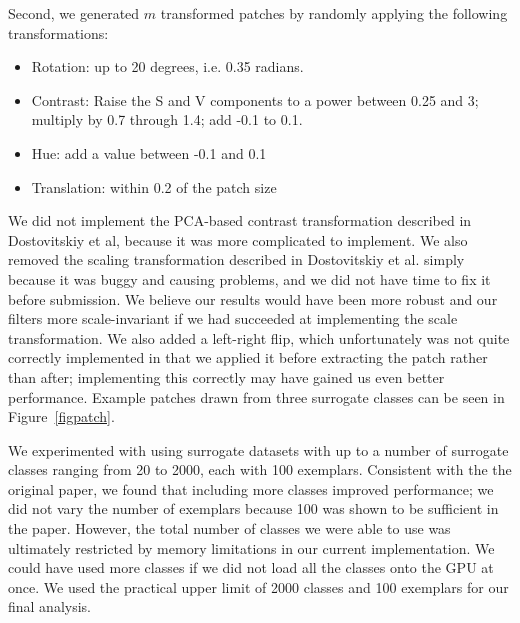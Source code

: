 \documentclass{article} %
\newenvironment{itemizedense}{
\begin{itemize}
  \setlength{\itemsep}{1pt}
  \setlength{\parskip}{0pt}
  \setlength{\parsep}{0pt}
}{\end{itemize}}
\begin{document}
Second, we generated $m$ transformed patches by randomly applying the following transformations:

\begin{itemizedense}
\item Rotation: up to 20 degrees, i.e. 0.35 radians.
\item Contrast: Raise the S and V components to a power between 0.25 and 3; multiply by 0.7 through 1.4; add -0.1 to 0.1.
\item Hue: add a value between -0.1 and 0.1
\item Translation: within 0.2 of the patch size
\end{itemizedense}

We did not implement the PCA-based contrast transformation described in Dostovitskiy et al, because it was more complicated to implement. We also removed the scaling transformation described in Dostovitskiy et al. simply because it was buggy and causing problems, and we did not have time to fix it before submission. We believe our results would have been more robust and our filters more scale-invariant if we had succeeded at implementing the scale transformation. We also added a left-right flip, which unfortunately was not quite correctly implemented in that we applied it before extracting the patch rather than after; implementing this correctly may have gained us even better performance. Example patches drawn from three surrogate classes can be seen in Figure~\ref{figpatch}.

We experimented with using surrogate datasets with up to a number of surrogate classes ranging from 20 to 2000, each with 100 exemplars. Consistent with the the original paper, we found that including more classes improved performance; we did not vary the number of exemplars because 100 was shown to be sufficient in the paper. However, the total number of classes we were able to use was ultimately restricted by memory limitations in our current implementation. We could have used more classes if we did not load all the classes onto the GPU at once. We used the practical upper limit of 2000 classes and 100 exemplars for our final analysis. 
\end{document}
